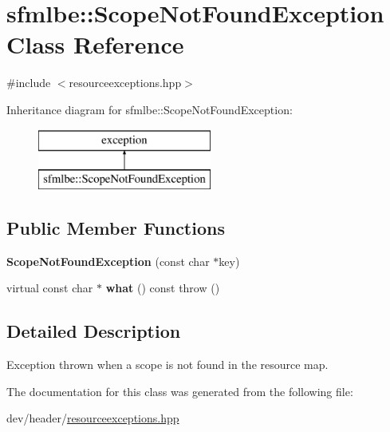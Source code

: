 \hypertarget{classsfmlbe_1_1_scope_not_found_exception}{}\section{sfmlbe\+:\+:Scope\+Not\+Found\+Exception Class Reference}
\label{classsfmlbe_1_1_scope_not_found_exception}


{\ttfamily \#include $<$resourceexceptions.\+hpp$>$}

Inheritance diagram for sfmlbe\+:\+:Scope\+Not\+Found\+Exception\+:\begin{figure}[H]
\begin{center}
\leavevmode
\includegraphics[height=2.000000cm]{classsfmlbe_1_1_scope_not_found_exception}
\end{center}
\end{figure}
\subsection*{Public Member Functions}
\begin{DoxyCompactItemize}
\item 
\mbox{\label{classsfmlbe_1_1_scope_not_found_exception_aa27280e9efa824c4ca80103a3eeaa881}} 
{\bfseries Scope\+Not\+Found\+Exception} (const char $\ast$key)
\item 
\mbox{\label{classsfmlbe_1_1_scope_not_found_exception_aa5a6fdb9880a3e3c8a573b6bd77440cb}} 
virtual const char $\ast$ {\bfseries what} () const  throw ()
\end{DoxyCompactItemize}


\subsection{Detailed Description}
Exception thrown when a scope is not found in the resource map. 

The documentation for this class was generated from the following file\+:\begin{DoxyCompactItemize}
\item 
dev/header/\mbox{\hyperlink{resourceexceptions_8hpp}{resourceexceptions.\+hpp}}\end{DoxyCompactItemize}
